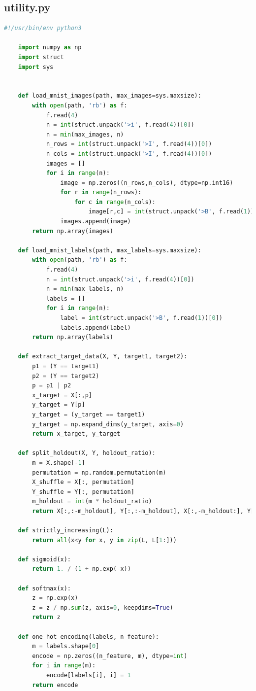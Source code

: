 \documentclass{article}
\begin{document}
\subsection{utility.py}
\begin{lstlisting}[language=Python,breaklines]
	#!/usr/bin/env python3
	
	import numpy as np
	import struct
	import sys
	
	
	def load_mnist_images(path, max_images=sys.maxsize):
	    with open(path, 'rb') as f:
	        f.read(4)
	        n = int(struct.unpack('>i', f.read(4))[0])
	        n = min(max_images, n)
	        n_rows = int(struct.unpack('>I', f.read(4))[0])
	        n_cols = int(struct.unpack('>I', f.read(4))[0])
	        images = []
	        for i in range(n):
	            image = np.zeros((n_rows,n_cols), dtype=np.int16)
	            for r in range(n_rows):
	                for c in range(n_cols):
	                    image[r,c] = int(struct.unpack('>B', f.read(1))[0])
	            images.append(image)
	    return np.array(images)
	
	def load_mnist_labels(path, max_labels=sys.maxsize):
	    with open(path, 'rb') as f:
	        f.read(4)
	        n = int(struct.unpack('>i', f.read(4))[0])
	        n = min(max_labels, n)
	        labels = []
	        for i in range(n):
	            label = int(struct.unpack('>B', f.read(1))[0])
	            labels.append(label)
	    return np.array(labels)
	
	def extract_target_data(X, Y, target1, target2):
	    p1 = (Y == target1)
	    p2 = (Y == target2)
	    p = p1 | p2
	    x_target = X[:,p]
	    y_target = Y[p]
	    y_target = (y_target == target1)
	    y_target = np.expand_dims(y_target, axis=0)
	    return x_target, y_target
	
	def split_holdout(X, Y, holdout_ratio):
	    m = X.shape[-1]
	    permutation = np.random.permutation(m)
	    X_shuffle = X[:, permutation]
	    Y_shuffle = Y[:, permutation]
	    m_holdout = int(m * holdout_ratio)
	    return X[:,:-m_holdout], Y[:,:-m_holdout], X[:,-m_holdout:], Y[:,-m_holdout:]
	
	def strictly_increasing(L):
	    return all(x<y for x, y in zip(L, L[1:]))
	
	def sigmoid(x):
	    return 1. / (1 + np.exp(-x))
	
	def softmax(x):
	    z = np.exp(x)
	    z = z / np.sum(z, axis=0, keepdims=True)
	    return z
	
	def one_hot_encoding(labels, n_feature):
	    m = labels.shape[0]
	    encode = np.zeros((n_feature, m), dtype=int)
	    for i in range(m):
	        encode[labels[i], i] = 1
	    return encode
	

\end{lstlisting}
\end{document}
